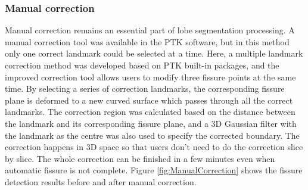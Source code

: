 {\subsubsection{Manual correction}
Manual correction remains an essential part of lobe segmentation processing. A manual correction tool was available in the PTK software, but in this method only one correct landmark could be selected at a time. Here, a multiple landmark correction method was developed based on PTK built-in packages, and the improved correction tool allows users to modify three fissure points at the same time. By selecting a series of correction landmarks, the corresponding fissure plane is deformed to a new curved surface which passes through all the correct landmarks. The correction region was calculated based on the distance between the landmark and its corresponding fissure plane, and a 3D Gaussian filter with the landmark as the centre was also used to specify the corrected boundary. The correction happens in 3D space so that users don't need to do the correction slice by slice. The whole correction can be finished in a few minutes even when automatic fissure is not complete. Figure \ref{fig:ManualCorrection} shows the fissure detection results before and after manual correction.

}
